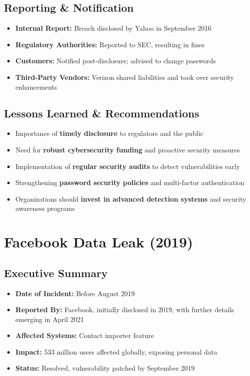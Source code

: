 \documentclass[11pt]{book}
\begin{document}
\section{Reporting \& Notification}
\begin{itemize}
    \item \textbf{Internal Report:} Breach disclosed by Yahoo in September 2016
    \item \textbf{Regulatory Authorities:} Reported to SEC, resulting in fines
    \item \textbf{Customers:} Notified post-disclosure; advised to change passwords
    \item \textbf{Third-Party Vendors:} Verizon shared liabilities and took over security enhancements
\end{itemize}

\section{Lessons Learned \& Recommendations}
\begin{itemize}
    \item Importance of \textbf{timely disclosure} to regulators and the public
    \item Need for \textbf{robust cybersecurity funding} and proactive security measures
    \item Implementation of \textbf{regular security audits} to detect vulnerabilities early
    \item Strengthening \textbf{password security policies} and multi-factor authentication
    \item Organizations should \textbf{invest in advanced detection systems} and security awareness programs
\end{itemize}

\chapter{Facebook Data Leak (2019)}

\section{Executive Summary}
\begin{itemize}
    \item \textbf{Date of Incident:} Before August 2019
    \item \textbf{Reported By:} Facebook, initially disclosed in 2019, with further details emerging in April 2021
    \item \textbf{Affected Systems:} Contact importer feature
    \item \textbf{Impact:} 533 million users affected globally, exposing personal data
    \item \textbf{Status:} Resolved, vulnerability patched by September 2019
\end{itemize}
\end{document}
